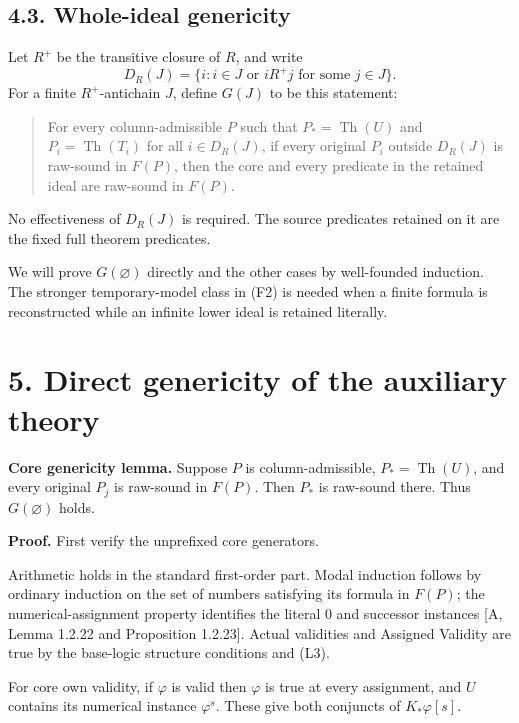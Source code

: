 \documentclass[
  11pt,
  letterpaper,
]{article}
\begin{document}
\subsection{4.3. Whole-ideal genericity}\label{whole-ideal-genericity}

Let \(R^+\) be the transitive closure of \(R\), and write \[
D_R(J)=\{i:i\in J\text{ or }iR^+j\text{ for some }j\in J\}.
\] For a finite \(R^+\)-antichain \(J\), define \(G(J)\) to be this
statement:

\begin{quote}
For every column-admissible \(P\) such that \(P_*=\operatorname{Th}(U)\)
and \(P_i=\operatorname{Th}(T_i)\) for all \(i\in D_R(J)\), if every
original \(P_i\) outside \(D_R(J)\) is raw-sound in \(F(P)\), then the
core and every predicate in the retained ideal are raw-sound in
\(F(P)\).
\end{quote}

No effectiveness of \(D_R(J)\) is required. The source predicates
retained on it are the fixed full theorem predicates.

We will prove \(G(\varnothing)\) directly and the other cases by
well-founded induction. The stronger temporary-model class in (F2) is
needed when a finite formula is reconstructed while an infinite lower
ideal is retained literally.

\section{5. Direct genericity of the auxiliary
theory}\label{direct-genericity-of-the-auxiliary-theory}

\textbf{Core genericity lemma.} Suppose \(P\) is column-admissible,
\(P_*=\operatorname{Th}(U)\), and every original \(P_j\) is raw-sound in
\(F(P)\). Then \(P_*\) is raw-sound there. Thus \(G(\varnothing)\)
holds.

\textbf{Proof.} First verify the unprefixed core generators.

Arithmetic holds in the standard first-order part. Modal induction
follows by ordinary induction on the set of numbers satisfying its
formula in \(F(P)\); the numerical-assignment property identifies the
literal \(0\) and successor instances {[}A, Lemma 1.2.22 and Proposition
1.2.23{]}. Actual validities and Assigned Validity are true by the
base-logic structure conditions and (L3).

For core own validity, if \(\varphi\) is valid then \(\varphi\) is true
at every assignment, and \(U\) contains its numerical instance
\(\varphi^s\). These give both conjuncts of \(K_*\varphi[s]\).
\end{document}
